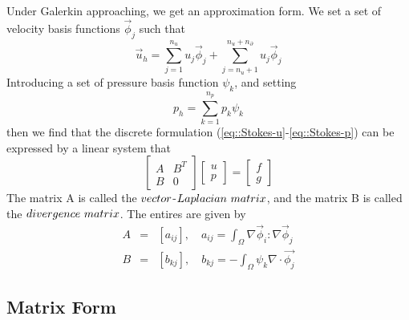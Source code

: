 \documentclass[a4paper]{article}
\begin{document}
Under Galerkin approaching, we get an approximation form.
We set a set of velocity basis functions {$\vec{\phi}_j$} such that
\begin{equation}
\vec{u}_h = \sum^{n_u}_{j=1}u_j\vec{\phi}_j + \sum^{n_u + n_\partial}_{j=n_u+1}u_j\vec{\phi}_j
\label{eq::Stokes-u}
\end{equation}
Introducing a set of pressure basis function {$\psi_k$}, and setting
\begin{equation}
p_h = \sum^{n_p}_{k=1}p_k\psi_k
\label{eq::Stokes-p}
\end{equation}
then we find that the discrete formulation (\ref{eq::Stokes-u}-\ref{eq::Stokes-p}) can be expressed by a linear system that
\begin{equation}
\left[ \begin{array}{ccc}
A & B^T \\
B & 0
\end{array}
\right]
\left[\begin{array}{ccc}
u\\
p
\end{array}
\right]=
\left[\begin{array}{ccc}
f\\
g
\end{array}
\right]
\label{mt::Stokes}
\end{equation}
The matrix A is called the $\mathnormal{vector}$-$\mathnormal{Laplacian\ matrix}$, and the matrix B is called the $\mathnormal{divergence\ matrix}$. The entires are given by
\begin{equation}
\begin{array}{rcl}
A &=& [a_{ij}], \quad a_{ij} = \int_{\Omega} \nabla \vec{\phi}_i : \nabla \vec{\phi}_j \\
B &=& [b_{kj}], \quad b_{kj} = -\int_{\Omega} \psi_k\nabla \cdot \vec{\phi_j}
\end{array}
\end{equation}


\subsection{Matrix Form}
\end{document}
